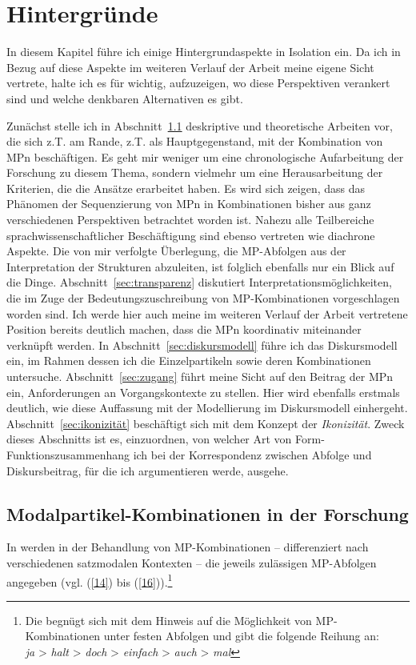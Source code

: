 \chapter{Hintergründe}
\label{chapter:hintergrund}
In diesem Kapitel führe ich einige Hintergrundaspekte in Isolation ein. Da ich in Bezug auf diese Aspekte im weiteren Verlauf der Arbeit meine eigene Sicht vertrete, halte ich es für wichtig, aufzuzeigen, wo diese Perspektiven verankert sind und welche denkbaren Alternativen es gibt.

Zunächst stelle ich in Abschnitt~\ref{sec:forschung} deskriptive und theoretische Arbeiten vor, die sich z.T. am Rande, z.T. als Hauptgegenstand, mit der Kombination von MPn beschäftigen. Es geht mir weniger um eine chronologische Aufarbeitung der Forschung zu diesem Thema, sondern vielmehr um eine Herausarbeitung der Kriterien, die die Ansätze erarbeitet haben. Es wird sich zeigen, dass das Phänomen der Sequenzierung von MPn in Kombinationen bisher aus ganz verschiedenen Perspektiven betrachtet worden ist. Nahezu alle Teilbereiche sprachwissenschaft\-licher Beschäftigung sind ebenso vertreten wie diachrone Aspekte. Die von mir verfolgte Überlegung, die MP-Abfolgen aus der Interpretation der Strukturen abzuleiten, ist folglich ebenfalls nur ein Blick auf die Dinge. Abschnitt~\ref{sec:transparenz} diskutiert Interpretationsmöglichkeiten, die im Zuge der Bedeutungszuschreibung von MP-Kombina\-tionen vorgeschlagen worden sind. Ich werde hier auch meine im weiteren Verlauf der Arbeit vertretene Position bereits deutlich machen, dass die MPn koordinativ miteinander verknüpft werden. In Abschnitt~\ref{sec:diskursmodell} führe ich das Diskursmodell ein, im Rahmen dessen ich die Einzelpartikeln sowie deren Kombinationen untersuche. Abschnitt~\ref{sec:zugang} führt meine Sicht auf den Beitrag der MPn ein, Anforderungen an Vorgangskontexte zu stellen. Hier wird ebenfalls erstmals deutlich, wie diese Auffassung mit der Modellierung im Diskursmodell einhergeht. Abschnitt~\ref{sec:ikonizität} beschäftigt sich mit dem Konzept der \textit{Ikonizität}. Zweck dieses Abschnitts ist es, einzuordnen, von welcher Art von Form-Funktionszusam\-menhang ich bei der Korrespondenz zwischen Abfolge und Diskursbeitrag, für die ich argumentieren werde, ausgehe.

\section{Modalpartikel-Kombinationen in der Forschung}
\label{sec:forschung}
In \citet[1542-1545]{Zifonun1997} werden in der Behandlung von MP-Kombinationen – differenziert nach verschiedenen satzmodalen Kontexten – die jeweils zulässigen MP-Abfolgen angegeben (vgl. (\ref{14}) bis (\ref{16})).\footnote{Die \citet[594]{Duden2009} begnügt sich mit dem Hinweis auf die Möglichkeit von MP-Kombinationen unter festen Abfolgen und gibt die folgende Reihung an: \\
\textit{ja} > \textit{halt} > \textit{doch} > \textit{einfach} > \textit{auch} > \textit{mal}}


